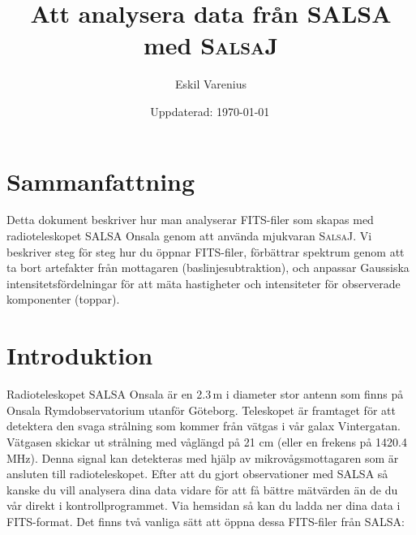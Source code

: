 \documentclass[11pt,swedish,a4paper]{article}
\begin{document}
\pagestyle{plain}
\title{\textsf{Att analysera data från SALSA med \textsc{SalsaJ}}}
\author{\textsf{Eskil Varenius}}
\yyyymmdddate
\date{\textsf{Uppdaterad: \today \, \currenttime}}
 

\maketitle

\section*{Sammanfattning}
Detta dokument beskriver hur man analyserar FITS-filer som skapas med 
radioteleskopet SALSA Onsala genom att använda mjukvaran \textsc{SalsaJ}. 
Vi beskriver steg för steg hur du öppnar FITS-filer, förbättrar spektrum
genom att ta bort artefakter från mottagaren (baslinjesubtraktion), och
anpassar Gaussiska intensitetsfördelningar för att mäta hastigheter
och intensiteter för observerade komponenter (toppar).

\tableofcontents

\section{Introduktion}
\label{sec:introduction}

Radioteleskopet SALSA Onsala är en 2.3\,m 
i diameter stor antenn som finns på Onsala Rymdobservatorium utanför
Göteborg. Teleskopet är framtaget för att detektera den svaga strålning
som kommer från vätgas i vår galax Vintergatan. Vätgasen skickar ut 
strålning med våglängd på 21 cm (eller en frekens på 1420.4 MHz). Denna
signal kan detekteras med hjälp av mikrovågsmottagaren som är ansluten
till radioteleskopet. Efter att du gjort observationer med SALSA så kanske
du vill analysera dina data vidare för att få bättre mätvärden än de du
vår direkt i kontrollprogrammet. Via hemsidan så kan du ladda ner dina 
data i FITS-format. Det finns två vanliga sätt att öppna dessa FITS-filer
från SALSA:
\end{document}
